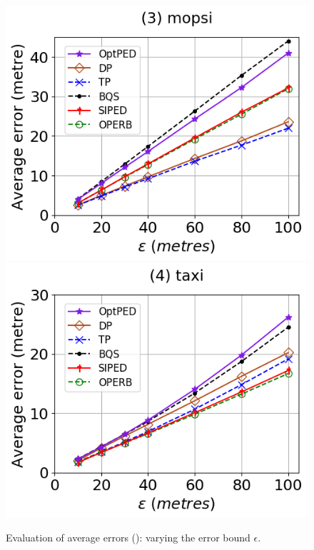 \begin{figure}[tb!]
	\includegraphics[scale=0.315]{Figures/Exp-PED-error-epsilon-mopsi.png}	\hspace{1ex}
	\includegraphics[scale=0.315]{Figures/Exp-PED-error-epsilon-taxi.png} 
	\vspace{-2.5ex}
	\caption{\small Evaluation of average errors (\ped): varying the error bound $\epsilon$.}
	\label{fig:ae-ped}
	\vspace{-2ex}
\end{figure}

